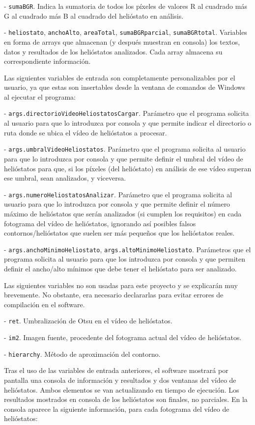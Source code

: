 - \verb|sumaBGR|. Indica la sumatoria de todos los píxeles de valores R al cuadrado más G al cuadrado más B al cuadrado del helióstato en análisis.

- \verb|heliostato|, \verb|anchoAlto|, \verb|areaTotal|, \verb|sumaBGRparcial|, \verb|sumaBGRtotal|. Variables en forma de arrays que almacenan (y después muestran en consola) los textos, datos y resultados de los helióstatos analizados. Cada array almacena su correspondiente información.

Las siguientes variables de entrada son completamente personalizables por el usuario, ya que estas son insertables desde la ventana de comandos de Windows al ejecutar el programa:

- \verb|args.directorioVideoHeliostatosCargar|. Parámetro que el programa solicita al usuario para que lo introduzca por consola y que permite indicar el directorio o ruta donde se ubica el vídeo de helióstatos a procesar.

- \verb|args.umbralVideoHeliostatos|. Parámetro que el programa solicita al usuario para que lo introduzca por consola y que permite definir el umbral del vídeo de helióstatos para que, si los píxeles (del helióstato) en análisis de ese vídeo superan ese umbral, sean analizados, y viceversa.

- \verb|args.numeroHeliostatosAnalizar|. Parámetro que el programa solicita al usuario para que lo introduzca por consola y que permite definir el número máximo de helióstatos que serán analizados (si cumplen los requisitos) en cada fotograma del vídeo de helióstatos, ignorando así posibles falsos contornos/helióstatos que suelen ser más pequeños que los helióstatos reales.

- \verb|args.anchoMinimoHeliostato|, \verb|args.altoMinimoHeliostato|. Parámetros que el programa solicita al usuario para que los introduzca por consola y que permiten definir el ancho/alto mínimos que debe tener el helióstato para ser analizado.

Las siguientes variables no son usadas para este proyecto y se explicarán muy brevemente. No obstante, era necesario declararlas para evitar errores de compilación en el software.

- \verb|ret|. Umbralización de Otsu en el vídeo de helióstatos.

- \verb|im2|. Imagen fuente, procedente del fotograma actual del vídeo de helióstatos.

- \verb|hierarchy|. Método de aproximación del contorno.

Tras el uso de las variables de entrada anteriores, el software mostrará por pantalla una consola de información y resultados y dos ventanas del vídeo de helióstatos. Ambos elementos se van actualizando en tiempo de ejecución. Los resultados mostrados en consola de los helióstatos son finales, no parciales. En la consola aparece la siguiente información, para cada fotograma del vídeo de helióstatos:

